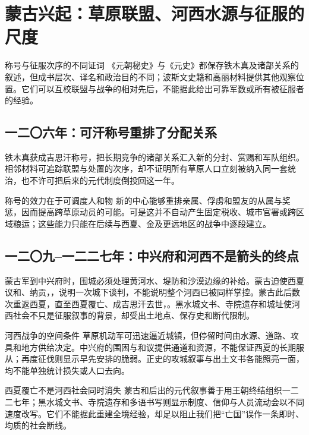 \section{蒙古兴起：草原联盟、河西水源与征服的尺度}

\begin{textwindow}{称号与征服次序的不同证词}
《元朝秘史》与《元史》都保存铁木真及诸部关系的叙述，但成书层次、译名和政治目的不同；波斯文史籍和高丽材料提供其他观察位置。它们可以互校联盟与战争的相对先后，不能据此给出可靠军数或所有被征服者的经验。
\end{textwindow}

\subsection{一二〇六年：可汗称号重排了分配关系}
铁木真获成吉思汗称号，把长期竞争的诸部关系汇入新的分封、赏赐和军队组织。相邻材料可追踪联盟与处置的次序，却不证明所有草原人口立刻被纳入同一套统治，也不许可把后来的元代制度倒投回这一年。

\begin{turningpoint}{称号的效力在于可调度人和物}
新的中心能够重排亲属、俘虏和盟友的从属与奖惩，因而提高跨草原动员的可能。可是这并不自动产生固定税收、城市官署或跨区域粮运；这些能力只能在后续与西夏、金及更远地区的战争中逐段建立。
\end{turningpoint}

\subsection{一二〇九--一二二七年：中兴府和河西不是箭头的终点}
蒙古军到中兴府时，围城必须处理黄河水、堤防和沙漠边缘的补给。蒙古迫使西夏议和、纳贡，，说明一次城下谈判，不能说明整个河西已被同样掌控。蒙古此后数次重返西夏，直至西夏覆亡、成吉思汗去世，。黑水城文书、寺院遗存和城址使河西社会不只是征服叙事的背景，却受出土地点、保存史和断代限制。

\begin{causalchain}{河西战争的空间条件}
草原机动军可迅速逼近城镇，但停留时间由水源、道路、攻具和地方供给决定。中兴府的围困与和议提供通道和资源，不能保证西夏的长期服从；再度征伐则显示早先安排的脆弱。正史的攻城叙事与出土文书各能照亮一面，均不能单独统计损失或人口去向。
\end{causalchain}

\begin{debate}{西夏覆亡不是河西社会同时消失}
蒙古和后出的元代叙事善于用王朝终结组织一二二七年；黑水城文书、寺院遗存和多语书写则显示制度、信仰与人员流动会以不同速度改写。它们不能据此重建全境经验，却足以阻止我们把“亡国”误作一条即时、均质的社会断线。
\end{debate}


